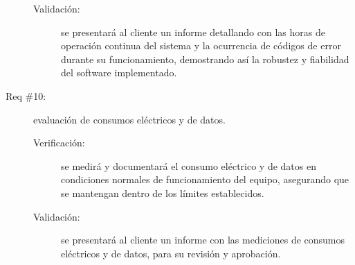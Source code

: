 \begin{description}
\begin{description}
		\item [Validación:] se presentará al cliente un informe detallando con las horas de operación continua del sistema y la ocurrencia de códigos de error durante su funcionamiento, demostrando así la robustez y fiabilidad del software implementado.
	\end{description}
	
	\item [Req \#10:] evaluación de consumos eléctricos y de datos.
	
	\begin{description}
		\item [Verificación:] se medirá y documentará el consumo eléctrico y de datos en condiciones normales de funcionamiento del equipo, asegurando que se mantengan dentro de los límites establecidos.
		\item [Validación:] se presentará al cliente un informe con las mediciones de consumos eléctricos y de datos, para su revisión y aprobación.
	\end{description}
	
\end{description}
